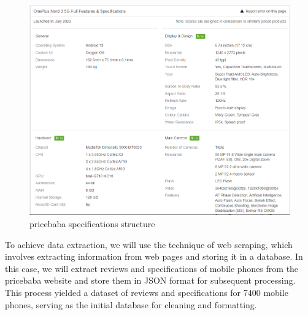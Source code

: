 \begin{figure}[H]
    \centering
    \includegraphics[width=12cm]{images/pricebaba_spec_structure.png}
    \caption{pricebaba specifications structure}
    \label{fig:pricebaba-spec-structure}
\end{figure}
To achieve data extraction, we will use the technique of web scraping, which involves extracting information from web pages and storing it in a database. In this case, we will extract reviews and specifications of mobile phones from the pricebaba website and store them in JSON format for subsequent processing. This process yielded a dataset of reviews and specifications for 7400 mobile phones, serving as the initial database for cleaning and formatting.

